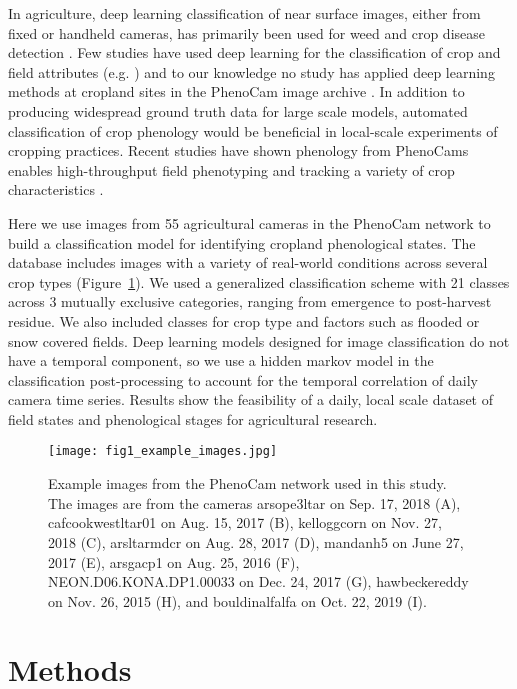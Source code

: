 \documentclass[remotesensing,article,submit,moreauthors,pdftex]{Definitions/mdpi}
\begin{document}
In agriculture, deep learning classification of near surface images, either from fixed or handheld cameras, has primarily been used for weed and crop disease detection \citep{benos2021}. Few studies have used deep learning for the classification of crop and field attributes (e.g. \cite{yalcin2017, han-shi2021, chamara2021}) and to our knowledge no study has applied deep learning methods at cropland sites in the PhenoCam image archive \citep{richardson2019}. In addition to producing widespread ground truth data for large scale models, automated classification of crop phenology would be beneficial in local-scale experiments of cropping practices. Recent studies have shown phenology from PhenoCams enables high-throughput field phenotyping and tracking a variety of crop characteristics \citep{aasen2020, liu2022}.

Here we use images from 55 agricultural cameras in the PhenoCam network to build a classification model for identifying cropland phenological states. The database includes images with a variety of real-world conditions across several crop types (Figure~\ref{fig1}). We used a generalized classification scheme with 21 classes across 3 mutually exclusive categories, ranging from emergence to post-harvest residue. We also included classes for crop type and factors such as flooded or snow covered fields. Deep learning models designed for image classification do not have a temporal component, so we use a hidden markov model in the classification post-processing to account for the temporal correlation of daily camera time series. Results show the feasibility of a daily, local scale dataset of field states and phenological stages for agricultural research.

\begin{figure}[H]
    \texttt{[image: fig1\_example\_images.jpg]}
    \caption{Example images from the PhenoCam network used in this study. The images are from the cameras arsope3ltar on Sep. 17, 2018 (A), cafcookwestltar01 on Aug. 15, 2017 (B), kelloggcorn on Nov. 27, 2018 (C), arsltarmdcr on Aug. 28, 2017 (D), mandanh5 on June 27, 2017 (E),  arsgacp1 on Aug. 25, 2016 (F), NEON.D06.KONA.DP1.00033 on Dec. 24, 2017 (G), hawbeckereddy on Nov. 26, 2015 (H), and bouldinalfalfa on Oct. 22, 2019 (I).
}
    \label{fig1}
\end{figure}

\section{Methods}
\end{document}
